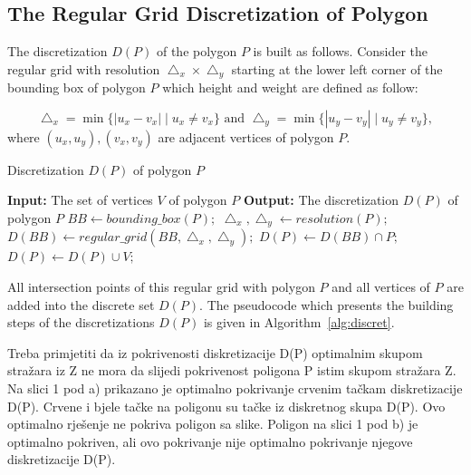 \documentclass[runningheads,a4paper]{elsarticle}
\begin{document}
	
	\subsection{The Regular Grid Discretization of Polygon}\label{sec:regulardiscretization}
	The discretization $D(P)$ of the polygon $P$ is built as follows. Consider the regular grid with resolution $\bigtriangleup_{x}\times\bigtriangleup_{y}$ starting at the lower left corner of the bounding box of polygon $P$ which height and weight are defined as follow:

	\begin{equation}
         \bigtriangleup_{x}=\min\{ |u_{x}-v_{x}|\mid u_{x}\neq v_{x}\} \mbox{ and }
         \bigtriangleup_{y}=\min\{ |u_{y}-v_{y}|\mid u_{y}\neq v_{y}\},
 	\end{equation}
where $ (u_{x},u_{y}),(v_{x},v_{y})$ are adjacent vertices of polygon $P$.
	
	\begin{algorithm}[!t]
		\caption{Discretization $D(P)$ of polygon $P$}\label{alg:discret}
		\begin{algorithmic}[1]
			\State \textbf{Input:} The set of vertices $V$ of polygon $P$
			\State \textbf{Output:} The discretization $D(P)$ of polygon $P$
			\State $BB \gets bounding\_box(P);$
			\State $\bigtriangleup_{x},\bigtriangleup_{y} \gets resolution(P);$
			\State $D(BB) \gets regular\_grid(BB,\bigtriangleup_{x},\bigtriangleup_{y});$
			\State $D(P) \gets D(BB) \cap P;$
			\State $D(P) \gets D(P) \cup V;$
		\end{algorithmic}
	\end{algorithm}

	All intersection points of this regular grid with polygon $P$ and all vertices of $P$ are added into the discrete set $D(P)$. The pseudocode which presents the building steps of the discretizations $D(P)$ is given in Algorithm~\ref{alg:discret}.
	
	
	Treba primjetiti da iz pokrivenosti diskretizacije D(P) optimalnim skupom stražara iz Z ne mora da slijedi pokrivenost poligona P istim skupom stražara Z. Na slici 1 pod a) prikazano je optimalno pokrivanje crvenim tačkam diskretizacije D(P). Crvene i bjele tačke na poligonu su tačke iz diskretnog skupa D(P). Ovo optimalno rješenje ne pokriva poligon sa slike. Poligon na slici 1 pod b) je optimalno pokriven, ali ovo pokrivanje nije optimalno pokrivanje njegove diskretizacije D(P).
	
\end{document}
